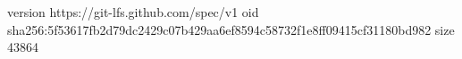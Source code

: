 version https://git-lfs.github.com/spec/v1
oid sha256:5f53617fb2d79dc2429c07b429aa6ef8594c58732f1e8ff09415cf31180bd982
size 43864
